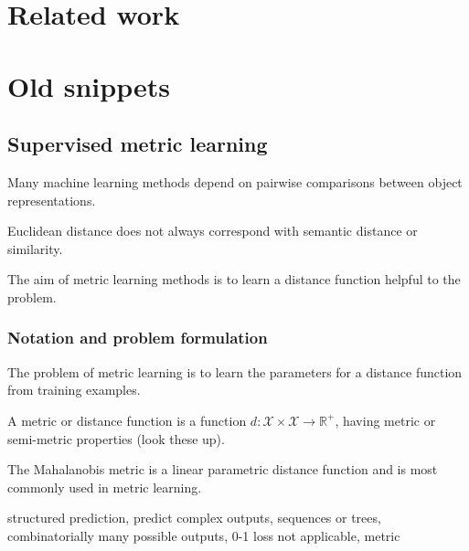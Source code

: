 \section{Related work}





\section*{Old snippets}


\subsection{Supervised metric learning}
\label{sec:metric_learning}



Many machine learning methods depend on pairwise comparisons between object representations. 

Euclidean distance does not always correspond with semantic distance or similarity.

The aim of metric learning methods is to learn a distance function helpful to the problem.




\subsubsection{Notation and problem formulation}


The problem of metric learning is to learn the parameters for a distance function from training examples.

A metric or distance function is a function $d: \mathcal{X} \times \mathcal{X} \rightarrow \mathbb{R}^{+}$, having metric or semi-metric properties (look these up).

The Mahalanobis metric is a linear parametric distance function and is most commonly used in metric learning.



structured prediction, predict complex outputs, sequences or trees, combinatorially many possible outputs, 0-1 loss not applicable, metric 

